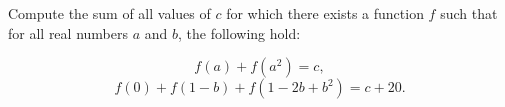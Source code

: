 Compute the sum of all values of $c$ for which there exists a function $f$ such that for all real numbers $a$ and $b$, the following hold:

\[f(a) + f(a^2) = c,\]\[f(0) + f(1 - b) + f(1 -2b + b^2) = c + 20.\]
